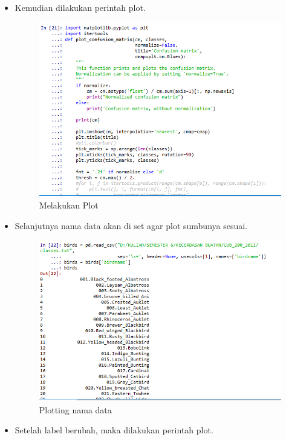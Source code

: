 \begin{enumerate}
\begin{itemize}
		\item Kemudian dilakukan perintah plot.
			\begin{figure}[ht]
			\centering
			\includegraphics[scale=0.5]{figures/AIP/ai27.PNG}
			\caption{Melakukan Plot}
			\label{contoh}
			\end{figure}
		\item Selanjutnya nama data akan di set agar plot sumbunya sesuai.
			\begin{figure}[ht]
			\centering
			\includegraphics[scale=0.5]{figures/AIP/ai28.PNG}
			\caption{Plotting nama data}
			\label{contoh}
			\end{figure}
		\item Setelah label berubah, maka dilakukan perintah plot.
		\begin{figure}[ht]
			\centering

\end{figure}
\end{itemize}
\end{enumerate}

